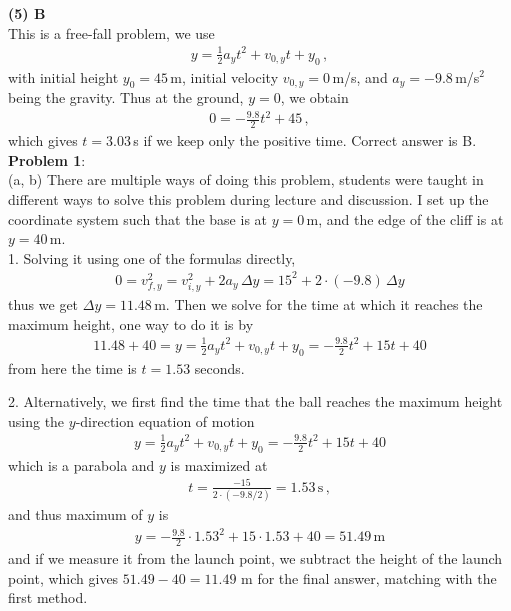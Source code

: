 \documentclass[11pt, onesided]{book}
\theoremstyle{break}
\theoremstyle{break}
\begin{document}
\noindent \textbf{(5) B}\\
This is a free-fall problem, we use
\begin{align*}
y = \frac{1}{2}a_y t^2 + v_{0,y} t+ y_0\,,
\end{align*}
with initial height $y_0 = 45\,$m, initial velocity $v_{0,y}=0\,$m/s, and $a_y = -9.8\,$m/s$^2$ being the gravity. Thus at the ground, $y=0$, we obtain
\begin{align*}
0 = -\frac{9.8}{2} t^2 + 45\,,
\end{align*}
which gives $t = 3.03\,$s if we keep only the positive time. Correct answer is B. \\

\newpage
\noindent\textbf{Problem 1}:\\

(a, b) There are multiple ways of doing this problem, students were taught in different ways to solve this problem during lecture and discussion. I set up the coordinate system such that the base is at $y=0\,$m, and the edge of the cliff is at $y=40\,$m. \\

1. Solving it using one of the formulas directly, 
\begin{align*}
0 = v_{f,y}^2 = v_{i,y}^2 + 2a_y\, \Delta y = 15^2 + 2\cdot(-9.8) \, \Delta y 
\end{align*}
thus we get $\Delta y = 11.48 \,\text{m}$. Then we solve for the time at which it reaches the maximum height, one way to do it is by
\begin{align*}
11.48 +40 = y = \frac{1}{2}a_y t^2 + v_{0,y} t+ y_0  = -\frac{9.8}{2} t^2 + 15 t + 40
\end{align*}
from here the time is $t=1.53$ seconds.

2. Alternatively, we first find the time that the ball reaches the maximum height using the $y$-direction equation of motion
\begin{align*}
y = \frac{1}{2}a_y t^2 + v_{0,y} t+ y_0 = -\frac{9.8}{2} t^2 + 15 t + 40
\end{align*}
which is a parabola and $y$ is maximized at
\begin{align*}
t = \frac{-15}{2\cdot (-9.8/2)} = 1.53\,\text{s}\,,
\end{align*}
and thus maximum of $y$ is
\begin{align*}
y = -\frac{9.8}{2} \cdot 1.53^2 + 15 \cdot 1.53 + 40= 51.49\,\text{m}
\end{align*}
and if we measure it from the launch point, we subtract the height of the launch point, which gives $51.49 - 40 = 11.49$ m for the final answer, matching with the first method.\\
\end{document}
